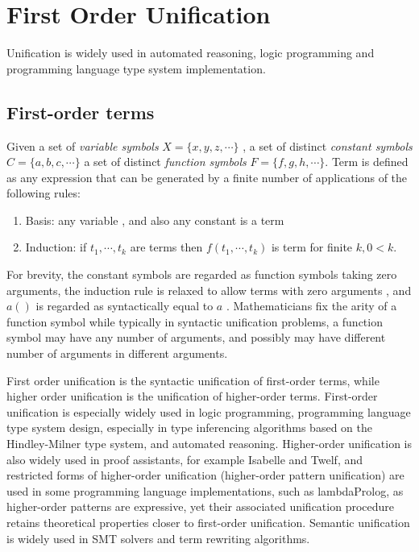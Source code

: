 \section{First Order Unification}

 Unification is widely used in automated reasoning, logic programming
 and programming language type system implementation.


\subsection{First-order terms}

Given a set of \textit{variable symbols} $X = \{x,y,z,\cdots \}$ , a
set of distinct \textit{constant symbols} $ C = \{ a,b,c,\cdots \}$ a
set of distinct \textit{function symbols} $F = \{f,g,h, \cdots
\}$. Term is defined as any expression that can be generated by a
finite number of applications of the following rules:


\begin{enumerate}
\item Basis: any variable , and also any constant  is a term
\item Induction: if $t_1, \cdots, t_k$ are terms then $f(t_1,\cdots,
  t_k)$ is term for finite $k, 0 < k$.
\end{enumerate}


For brevity, the constant symbols are regarded as function symbols
taking zero arguments, the induction rule is relaxed to allow terms
with zero arguments , and $a()$ is regarded as syntactically equal to
$a$ . Mathematicians fix the arity of a function symbol while
typically in syntactic unification problems, a function symbol may
have any number of arguments, and possibly may have different number
of arguments in different arguments.

First order unification is the syntactic unification of first-order
terms, while higher order unification is the unification of
higher-order terms. First-order unification is especially widely used
in logic programming, programming language type system design,
especially in type inferencing algorithms based on the Hindley-Milner
type system, and automated reasoning. Higher-order unification is also
widely used in proof assistants, for example Isabelle and Twelf, and
restricted forms of higher-order unification (higher-order pattern
unification) are used in some programming language implementations,
such as lambdaProlog, as higher-order patterns are expressive, yet
their associated unification procedure retains theoretical properties
closer to first-order unification. Semantic unification is widely used
in SMT solvers and term rewriting algorithms.

